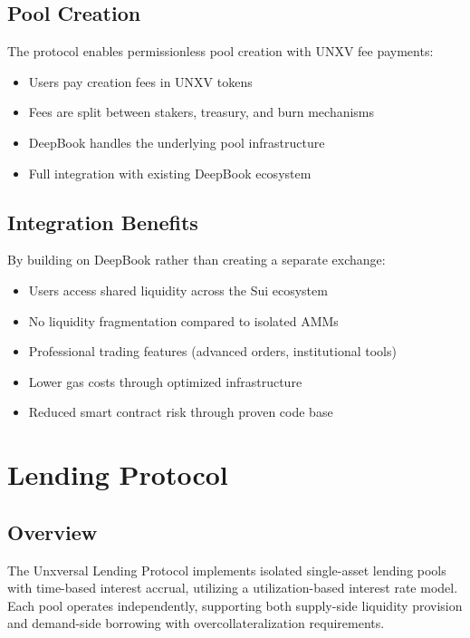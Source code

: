 \documentclass[12pt]{article}
\begin{document}
\subsection{Pool Creation}

The protocol enables permissionless pool creation with UNXV fee payments:
\begin{itemize}
    \item Users pay creation fees in UNXV tokens
    \item Fees are split between stakers, treasury, and burn mechanisms
    \item DeepBook handles the underlying pool infrastructure
    \item Full integration with existing DeepBook ecosystem
\end{itemize}

\subsection{Integration Benefits}

By building on DeepBook rather than creating a separate exchange:
\begin{itemize}
    \item Users access shared liquidity across the Sui ecosystem
    \item No liquidity fragmentation compared to isolated AMMs
    \item Professional trading features (advanced orders, institutional tools)
    \item Lower gas costs through optimized infrastructure
    \item Reduced smart contract risk through proven code base
\end{itemize}

\section{Lending Protocol}

\subsection{Overview}

The Unxversal Lending Protocol implements isolated single-asset lending pools with time-based interest accrual, utilizing a utilization-based interest rate model. Each pool operates independently, supporting both supply-side liquidity provision and demand-side borrowing with overcollateralization requirements.
\end{document}
